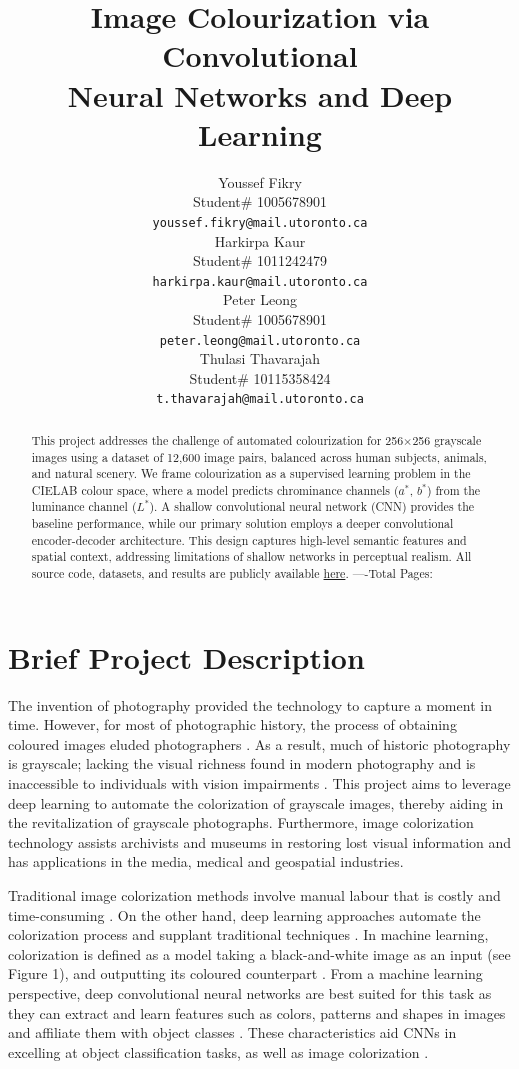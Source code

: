 \documentclass{article} %
\title{Image Colourization via Convolutional \\
Neural Networks and Deep Learning}
\author{Youssef Fikry  \\
Student\# 1005678901\\
\texttt{youssef.fikry@mail.utoronto.ca} \\
\And Harkirpa Kaur  \\
Student\# 1011242479 \\
\texttt{harkirpa.kaur@mail.utoronto.ca} \\
\AND
Peter Leong \\
Student\# 1005678901 \\
\texttt{peter.leong@mail.utoronto.ca} \\
\And
Thulasi Thavarajah \\
Student\# 10115358424 \\
\texttt{t.thavarajah@mail.utoronto.ca} \\
\AND
}
\begin{document}
\maketitle

\begin{abstract}
This project addresses the challenge of automated colourization for 256$\times$256 grayscale images using a dataset of 12,600 image pairs, balanced across human subjects, 
animals, and natural scenery. We frame colourization as a supervised learning problem in the CIELAB colour space, where a model predicts chrominance channels ($a^*$, $b^*$) 
from the luminance channel ($L^*$). A shallow convolutional neural network (CNN) provides the baseline performance, while our primary solution employs a deeper convolutional encoder-decoder architecture. This 
design captures high-level semantic features and spatial context, addressing limitations of shallow networks in perceptual realism. All source code, datasets, and results 
are publicly available \href{https://drive.google.com/drive/folders/1cV1NhlQ8UTk_CgJdwhqeRu0z5xE85ZsI?usp=sharing}{here}. 
----Total Pages: \pageref{last_page}
\end{abstract}


\section{Brief Project Description}

The invention of photography provided the technology to capture a moment in time. However, for most of photographic history, the process of obtaining coloured images eluded photographers \citep{scienceandmediamuseum2020}. As a result, much of historic photography is grayscale; lacking the visual richness found in modern photography and is inaccessible to individuals with vision impairments \citep{vogelsang2024impact}. This project aims to leverage deep learning to automate the colorization of grayscale images, thereby aiding in the revitalization of grayscale photographs. Furthermore, image colorization technology assists archivists and museums in restoring lost visual information and has applications in the media, medical and geospatial industries. 

Traditional image colorization methods involve manual labour that is costly and time-consuming \citep{farella2022}. On the other hand, deep learning approaches automate the colorization process and supplant traditional techniques \citep{farella2022}. In machine learning, colorization is defined as a model taking a black-and-white image as an input (see Figure 1), and outputting its coloured counterpart \citep{lettherebecolor}. From a machine learning perspective, deep convolutional neural networks are best suited for this task as they can extract and learn features such as colors, patterns and shapes in images and affiliate them with object classes \citep{deepcnn}. These characteristics aid CNNs in excelling at object classification tasks, as well as image colorization \citep{deepcnn}. 
\end{document}
